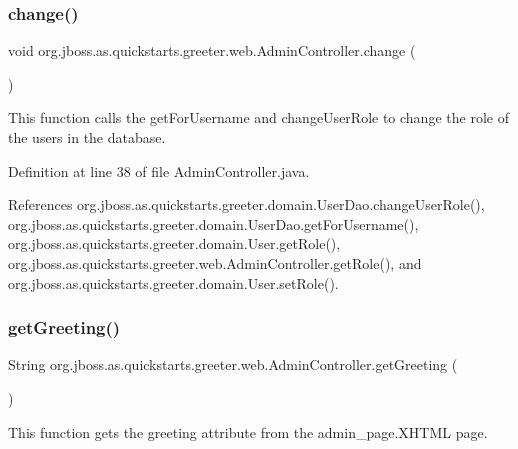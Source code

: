 \subsubsection{\texorpdfstring{change()}{change()}}
{\footnotesize\ttfamily void org.\+jboss.\+as.\+quickstarts.\+greeter.\+web.\+Admin\+Controller.\+change (\begin{DoxyParamCaption}{ }\end{DoxyParamCaption})}



This function calls the get\+For\+Username and change\+User\+Role to change the role of the users in the database. 



Definition at line 38 of file Admin\+Controller.\+java.



References org.\+jboss.\+as.\+quickstarts.\+greeter.\+domain.\+User\+Dao.\+change\+User\+Role(), org.\+jboss.\+as.\+quickstarts.\+greeter.\+domain.\+User\+Dao.\+get\+For\+Username(), org.\+jboss.\+as.\+quickstarts.\+greeter.\+domain.\+User.\+get\+Role(), org.\+jboss.\+as.\+quickstarts.\+greeter.\+web.\+Admin\+Controller.\+get\+Role(), and org.\+jboss.\+as.\+quickstarts.\+greeter.\+domain.\+User.\+set\+Role().

\mbox{\label{classorg_1_1jboss_1_1as_1_1quickstarts_1_1greeter_1_1web_1_1_admin_controller_ac2e8850b121c41e02714c4fea008dcfa}} 
\subsubsection{\texorpdfstring{get\+Greeting()}{getGreeting()}}
{\footnotesize\ttfamily String org.\+jboss.\+as.\+quickstarts.\+greeter.\+web.\+Admin\+Controller.\+get\+Greeting (\begin{DoxyParamCaption}{ }\end{DoxyParamCaption})}



This function gets the greeting attribute from the admin\+\_\+page.\+X\+H\+T\+ML page. 



